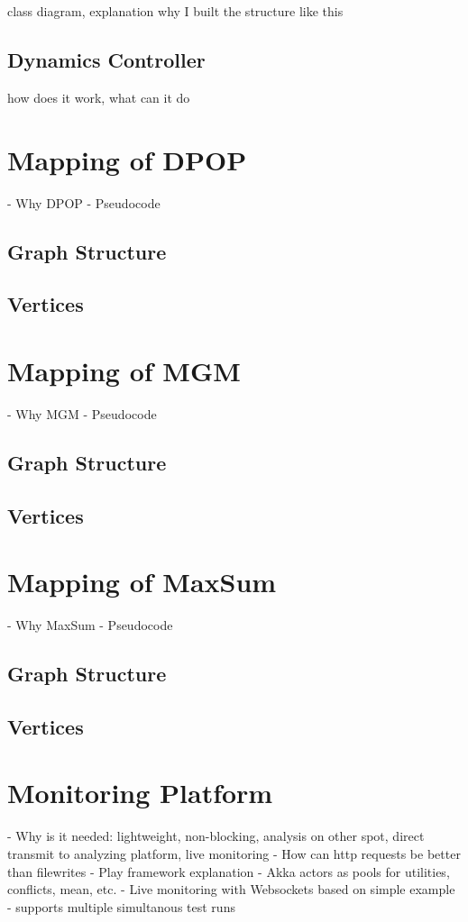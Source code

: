 class diagram, explanation why I built the structure like this

\subsection{Dynamics Controller}

how does it work, what can it do

\section{Mapping of DPOP}
    
    - Why DPOP
    - Pseudocode

\subsection{Graph Structure}
\subsection{Vertices}

\section{Mapping of MGM}

     - Why MGM
    - Pseudocode

\subsection{Graph Structure}
\subsection{Vertices}

\section{Mapping of MaxSum}
    
    - Why MaxSum
    - Pseudocode

\subsection{Graph Structure}
\subsection{Vertices}

\section{Monitoring Platform}

    - Why is it needed: lightweight, non-blocking, analysis on other spot, direct transmit to analyzing platform, live monitoring
    - How can http requests be better than filewrites
    - Play framework explanation
- Akka actors as pools for utilities, conflicts, mean, etc.
- Live monitoring with Websockets based on simple example
- supports multiple simultanous test runs
